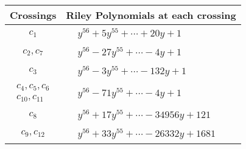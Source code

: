 \documentclass[1p]{elsarticle_modified}
\theoremstyle{definition}
\begin{document}
\begin{tabular}{m{50pt}|m{274pt}}
Crossings & \hspace{64pt}Riley Polynomials at each crossing \\
\hline $$\begin{aligned}c_{1}\end{aligned}$$&$\begin{aligned}
&y^{56}+5 y^{55}+\cdots+20 y+1
\end{aligned}$\\
\hline $$\begin{aligned}c_{2},c_{7}\end{aligned}$$&$\begin{aligned}
&y^{56}-27 y^{55}+\cdots-4 y+1
\end{aligned}$\\
\hline $$\begin{aligned}c_{3}\end{aligned}$$&$\begin{aligned}
&y^{56}-3 y^{55}+\cdots-132 y+1
\end{aligned}$\\
\hline $$\begin{aligned}c_{4},c_{5},c_{6}\\c_{10},c_{11}\end{aligned}$$&$\begin{aligned}
&y^{56}-71 y^{55}+\cdots-4 y+1
\end{aligned}$\\
\hline $$\begin{aligned}c_{8}\end{aligned}$$&$\begin{aligned}
&y^{56}+17 y^{55}+\cdots-34956 y+121
\end{aligned}$\\
\hline $$\begin{aligned}c_{9},c_{12}\end{aligned}$$&$\begin{aligned}
&y^{56}+33 y^{55}+\cdots-26332 y+1681
\end{aligned}$\\
\hline
\end{tabular}
\vskip 2pc
\end{document}
